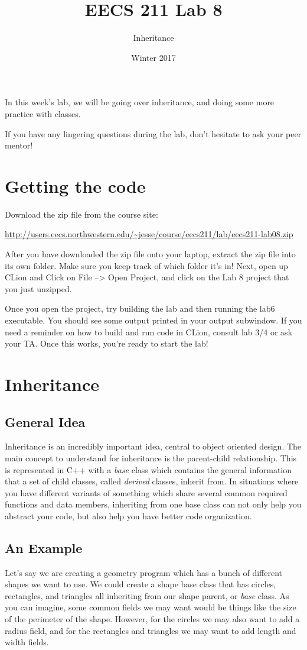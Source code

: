 \documentclass{tufte-handout}
\title{EECS 211 Lab 8}
\author{Inheritance}
\date{Winter 2017}
\begin{document}
\maketitle

In this week's lab, we will be going over inheritance, and doing some more practice with classes.


If you have any lingering questions during the lab, don't hesitate to ask your peer mentor!
\section{Getting the code}
Download the zip file from the course site: \medskip

\url{http://users.eecs.northwestern.edu/~jesse/course/eecs211/lab/eecs211-lab08.zip}

\medskip \noindent
After you have downloaded the zip file onto your laptop, extract the zip file into its own folder. Make sure you keep track of which folder it's in!  Next, open up CLion and Click on File --> Open Project, and click on the Lab 8 project that you just unzipped. 

Once you open the project, try building the lab and then running the lab6 executable. 
You should see some output printed in your output subwindow.
If you need a reminder on how to build and run code in CLion, consult lab 3/4 or ask your TA.
Once this works, you're ready to start the lab!

\section{Inheritance}

\subsection {General Idea}
Inheritance is an incredibly important idea, central to object oriented design.
The main concept to understand for inheritance is the parent-child relationship.
This is represented in C++ with a \textit{base} class which contains the general information that a set of child classes, called \textit{derived} classes, inherit from.
In situations where you have different variants of something which share several common required functions and data members, inheriting from one base class can not only help you abstract your code, but also help you have better code organization.

\subsection{An Example}
Let's say we are creating a geometry program which has a bunch of different shapes we want to use.
We could create a shape base class that has circles, rectangles, and triangles all inheriting from our shape parent, or \textit{base} class.
As you can imagine, some common fields we may want would be things like the size of the perimeter of the shape.
However, for the circles we may also want to add a radius field, and for the rectangles and triangles we may want to add length and width fields.
\end{document}
